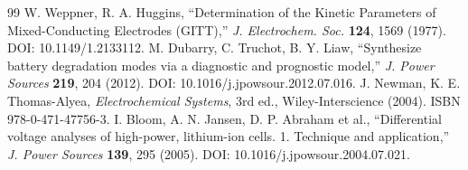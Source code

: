\documentclass[11pt,a4paper]{article}
\begin{document}
\begin{thebibliography}{99}
 W. Weppner, R. A. Huggins, ``Determination of the Kinetic Parameters of Mixed-Conducting Electrodes (GITT),'' \emph{J. Electrochem. Soc.} \textbf{124}, 1569 (1977). DOI: 10.1149/1.2133112.
 M. Dubarry, C. Truchot, B. Y. Liaw, ``Synthesize battery degradation modes via a diagnostic and prognostic model,'' \emph{J. Power Sources} \textbf{219}, 204 (2012). DOI: 10.1016/j.jpowsour.2012.07.016.
 J. Newman, K. E. Thomas-Alyea, \emph{Electrochemical Systems}, 3rd ed., Wiley-Interscience (2004). ISBN 978-0-471-47756-3.
 I. Bloom, A. N. Jansen, D. P. Abraham et al., ``Differential voltage analyses of high-power, lithium-ion cells. 1. Technique and application,'' \emph{J. Power Sources} \textbf{139}, 295 (2005). DOI: 10.1016/j.jpowsour.2004.07.021.
\end{thebibliography}
\end{document}
